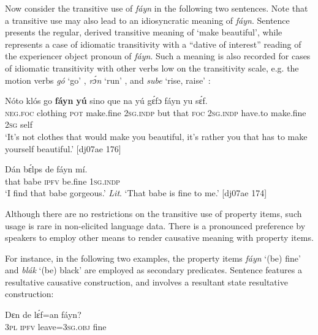 Now consider the transitive use of \textit{fáyn} in the following two sentences. Note that a transitive use may also lead to an idiosyncratic meaning of \textit{fáyn}. Sentence  presents the regular, derived transitive meaning of ‘make beautiful’, while  represents a case of idiomatic transitivity with a “dative of interest” reading of the experiencer object pronoun of \textit{fáyn}. Such a meaning is also recorded for cases of idiomatic transitivity with other verbs low on the transitivity scale, e.g. the motion verbs \textit{gó} ‘go’ , \textit{rɔ́n} ‘run’ , and \textit{sube} ‘rise, raise’ :

\ea%
    \label{ex:key:1121}
    \gll Nóto  klós    go \textbf{fáyn}  \textbf{yú} sino    que
na  yú    gɛ́fɔ    fáyn    yu  sɛ́f.\\
\textsc{neg}.\textsc{foc}  clothing  \textsc{pot}  make.fine  \textsc{2sg.indp}  but    that  
\textsc{foc}  \textsc{2sg.indp}  have.to  make.fine  \textsc{2sg}  self\\

\glt ‘It’s not clothes that would make you beautiful, it’s rather you 
that has to make yourself beautiful.’ [dj07ae 176]
\z


\ea%
    \label{ex:key:1122}
    \gll Dán  bɛ́lps  de  fáyn  mí.\\
that  babe  \textsc{ipfv}  be.fine  \textsc{1sg.indp}\\

\glt ‘I find that babe gorgeous.’ \textit{Lit}. ‘That babe is fine to me.’ [dj07ae 174]
\z

Although there are no restrictions on the transitive use of property items, such usage is rare in non-elicited language data. There is a pronounced preference by speakers to employ other means to render causative meaning with property items. 


For instance, in the following two examples, the property items \textit{fáyn} ‘(be) fine’ and \textit{blák} ‘(be) black’ are employed as secondary predicates. Sentence  features a resultative causative construction, and  involves a resultant state resultative construction: 



\ea%
    \label{ex:key:1123}
    \gll Dɛn  de  lɛ́f=an    fáyn?\\
\textsc{3pl}  \textsc{ipfv}  leave=\textsc{3sg.obj}  fine\\

